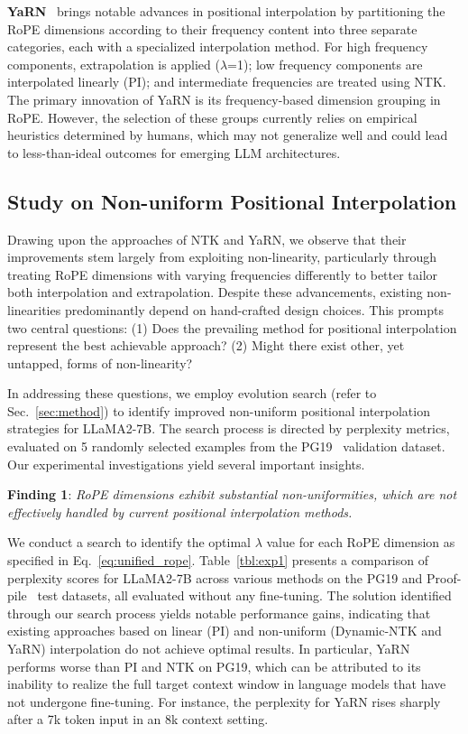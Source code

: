 \textbf{YaRN}~\cite{yarn} brings notable advances in positional interpolation by partitioning the RoPE dimensions according to their frequency content into three separate categories, each with a specialized interpolation method. For high frequency components, extrapolation is applied ($\lambda$=1); low frequency components are interpolated linearly (PI); and intermediate frequencies are treated using NTK. The primary innovation of YaRN is its frequency-based dimension grouping in RoPE. However, the selection of these groups currently relies on empirical heuristics determined by humans, which may not generalize well and could lead to less-than-ideal outcomes for emerging LLM architectures.

\subsection{Study on Non-uniform Positional Interpolation}

Drawing upon the approaches of NTK and YaRN, we observe that their improvements stem largely from exploiting non-linearity, particularly through treating RoPE dimensions with varying frequencies differently to better tailor both interpolation and extrapolation. Despite these advancements, existing non-linearities predominantly depend on hand-crafted design choices. This prompts two central questions: (1) Does the prevailing method for positional interpolation represent the best achievable approach? (2) Might there exist other, yet untapped, forms of non-linearity?

In addressing these questions, we employ evolution search (refer to Sec.~\ref{sec:method}) to identify improved non-uniform positional interpolation strategies for LLaMA2-7B. The search process is directed by perplexity metrics, evaluated on 5 randomly selected examples from the PG19~\cite{pg19} validation dataset. Our experimental investigations yield several important insights.

\textbf{Finding 1}: \textit{RoPE dimensions exhibit substantial non-uniformities, which are not effectively handled by current positional interpolation methods.}

We conduct a search to identify the optimal $\lambda$ value for each RoPE dimension as specified in Eq.~\ref{eq:unified_rope}. Table~\ref{tbl:exp1} presents a comparison of perplexity scores for LLaMA2-7B across various methods on the PG19 and Proof-pile~\cite{proof-pile} test datasets, all evaluated without any fine-tuning. The solution identified through our search process yields notable performance gains, indicating that existing approaches based on linear (PI) and non-uniform (Dynamic-NTK and YaRN) interpolation do not achieve optimal results. In particular, YaRN performs worse than PI and NTK on PG19, which can be attributed to its inability to realize the full target context window in language models that have not undergone fine-tuning. For instance, the perplexity for YaRN rises sharply after a 7k token input in an 8k context setting.

